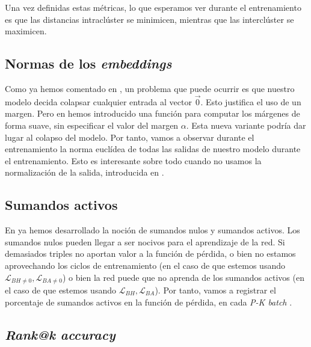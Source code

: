 Una vez definidas estas métricas, lo que esperamos ver durante el entrenamiento es que las distancias intraclúster se minimicen, mientras que las interclúster se maximicen.

\subsection{Normas de los \textit{embeddings}} \label{isubs:normas_embeddings}

Como ya hemos comentado en , un problema que puede ocurrir es que nuestro modelo decida colapsar cualquier entrada al vector $\vec{0}$. Esto justifica el uso de un margen. Pero en  hemos introducido una función para computar los márgenes de forma suave, sin especificar el valor del margen $\alpha$. Esta nueva variante podría dar lugar al colapso del modelo. Por tanto, vamos a observar durante el entrenamiento la norma euclídea de todas las salidas de nuestro modelo durante el entrenamiento. Esto es interesante sobre todo cuando no usamos la normalización de la salida, introducida en .

\subsection{Sumandos activos}

En  ya hemos desarrollado la noción de sumandos nulos y sumandos activos. Los sumandos nulos pueden llegar a ser nocivos para el aprendizaje de la red. Si demasiados triples no aportan valor a la función de pérdida, o bien no estamos aprovechando los ciclos de entrenamiento (en el caso de que estemos usando $\mathcal{L}_{BH \neq 0}, \mathcal{L}_{BA \neq 0}$) o bien  la red puede que no aprenda de los sumandos activos (en el caso de que estemos usando $\mathcal{L}_{BH}, \mathcal{L}_{BA}$). Por tanto, vamos a registrar el porcentaje de sumandos activos en la función de pérdida, en cada \textit{P-K batch} \footnotemark.


\subsection{\textit{Rank@k accuracy}} \label{isubs:rank_at_k}

